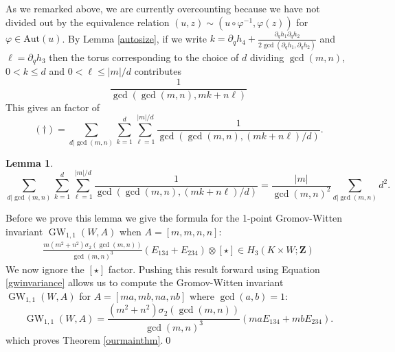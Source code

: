 \documentclass[11pt]{amsart}
\newcommand{\ZZ}{\mathbf{Z}}
\newcommand{\Aut}{\mathrm{Aut}}
\newcommand{\GW}{\operatorname{GW}}
\newcommand{\WW}{W}
\renewcommand{\phi}{\varphi}
\numberwithin{equation}{section}
\newtheorem{lma}[equation]{Lemma}
\theoremstyle{definition}
\theoremstyle{remark}
\begin{document}
As we remarked above, we are currently overcounting because we have not divided out by the equivalence relation $(u,z)\sim (u\circ\phi^{-1},\phi(z))$ for $\phi\in\Aut(u)$. By Lemma \ref{autosize}, if we write $k=\partial_qh_4+\frac{\partial_qh_1\partial_qh_2}{2\gcd(\partial_qh_1,\partial_qh_2)}$ and $\ell=\partial_qh_3$ then the torus corresponding to the choice of $d$ dividing $\gcd(m,n)$, $0<k\leq d$ and $0<\ell\leq |m|/d$ contributes
\[\frac{1}{\gcd(\gcd(m,n),mk+n\ell)}\]
This gives an factor of
\[(\dagger)=\sum_{d|\gcd(m,n)}\sum_{k=1}^{d}\sum_{\ell=1}^{|m|/d}\frac{1}{\gcd(\gcd(m,n),(mk+n\ell)/d)}.\]
\begin{lma}\label{ickymess}
\[\sum_{d|\gcd(m,n)}\sum_{k=1}^{d}\sum_{\ell=1}^{|m|/d}\frac{1}{\gcd(\gcd(m,n),(mk+n\ell)/d)}=\frac{|m|}{\gcd(m,n)^2}\sum_{d|\gcd(m,n)}d^2.\]
\end{lma}
Before we prove this lemma we give the formula for the 1-point Gromov-Witten invariant $\GW_{1,1}(\WW,A)$ when $A=[m,m,n,n]$:
\begin{gather*}
\frac{m(m^2+n^2)\sigma_2(\gcd(m,n))}{\gcd(m,n)^3}(E_{134}+E_{234})\otimes[\star]\in H_3(K\times\WW;\ZZ)
\end{gather*}
We now ignore the $[\star]$ factor. Pushing this result forward using Equation \eqref{gwinvariance} allows us to compute the Gromov-Witten invariant $\GW_{1,1}(\WW,A)$ for $A=[ma,mb,na,nb]$ where $\gcd(a,b)=1$:
\begin{equation}\label{gwinvt}\boxed{\GW_{1,1}(\WW,A)=\frac{(m^2+n^2)\sigma_2(\gcd(m,n))}{\gcd(m,n)^3}(maE_{134}+mbE_{234}).}\end{equation}
which proves Theorem \ref{ourmainthm}.\qed
\end{document}
